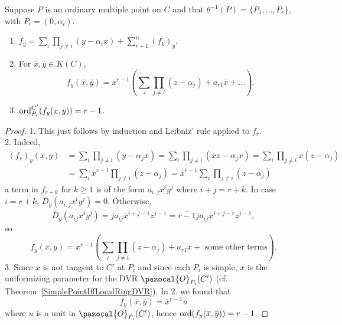         \begin{proposition}\label{OrderOfPartialDerivativeAtPlace}
            Suppose $P$ is an ordinary multiple point on $C$ and that $\theta^{-1}(P)=\{P_1,\dots,P_r\}$, with $P_i=(0,\alpha_i)$.
            \begin{enumerate}
                \item $f_y = \sum_i \prod_{j\neq i} (y-\alpha_i x) +\sum_{r+1}^n (f_k)_y$.
                \item For $\overline{x},\overline{y}\in K(C)$,
                $$
                    f_y(\overline{x},\overline{y}) = \overline{x}^{r-1}\left(\sum_{i}\prod_{j\neq i}(z-\alpha_j)+a_{r1}\overline{x}+\dots \right).
                $$
                \item $\mathrm{ord}^{C'}_{P_i}(f_y(x,y))=r-1$. 
            \end{enumerate}
        \end{proposition}
        \begin{proof}
            1. This just follows by induction and Leibniz' rule applied to $f_r$.\\
            2. Indeed,
            \begin{align*}
                (f_r)_y(\overline{x},\overline{y}) &= \sum_{i}\prod_{j\neq i}(\overline{y}-\alpha_j\overline{x}) = \sum_{i}\prod_{j\neq i}(\overline{x}z-\alpha_j\overline{x}) = \sum_{i}\prod_{j\neq i}\overline{x}(z-\alpha_j)\\  &= \sum_{i}\overline{x}^{r-1}\prod_{j\neq i}(z-\alpha_j)  = \overline{x}^{r-1}\sum_{i}\prod_{j\neq i}(z-\alpha_j) 
            \end{align*}
            a term in $f_{r+k}$ for $k\geq 1$ is of the form $a_{i,j}x^i y^j$ where $i+j=r+k$. In case $i=r+k$, $D_y(a_{i,j}x^i y^j)=0$. Otherwise,
            $$
                \overline{D_y(a_{ij}x^i y^j)}= ja_{ij}\overline{x}^{i+j-1}z^{j-1} = \overline{r-1} ja_{ij}\overline{x}^{i+j-r}z^{j-1},
            $$ 
            so 
            $$
                f_y(\overline{x},\overline{y}) = \overline{x}^{r-1}\left(\sum_{i}\prod_{j\neq i}(z-\alpha_j)+a_{r1}\overline{x}+\text{ some other terms} \right).
            $$
            3. Since $x$ is not tangent to $C'$ at $P_i$ and since each $P_i$ is simple, $\overline{x}$ is the uniformizing parameter for the DVR $\pazocal{O}_{P_i}(C')$ (cf. Theorem~\ref{SimplePointIffLocalRingDVR}). In 2. we found that 
            $$
                f_y(\overline{x},\overline{y}) = \overline{x}^{r-1}u
            $$ 
            where $u$ is a unit in $\pazocal{O}_{P_i}(C')$, hence $\mathrm{ord}(f_y(\overline{x},\overline{y}))=r-1$.
        \end{proof}
